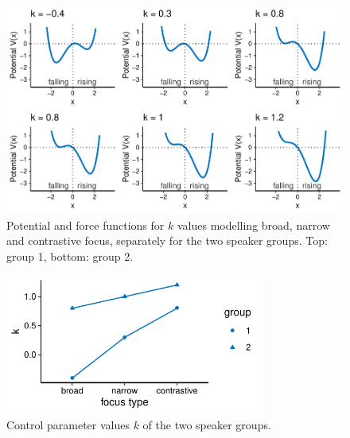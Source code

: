\begin{figure}[htbp]
\begin{center}
\includegraphics[width=\textwidth]{figures/ch6/potentials_groups.pdf}
\caption[Potential and force functions for $k$ values modelling broad (left), narrow (centre) and contrastive focus (right), separately for the two speaker groups.]{Potential and force functions for $k$ values modelling broad, narrow and contrastive focus, separately for the two speaker groups. Top: group 1, bottom: group 2.}
\label{fig:potentials_groups}
\end{center}
\end{figure}

\begin{figure}[htbp]
\begin{center}
\includegraphics[width=8.5cm]{figures/ch6/groups_k.pdf}
\caption{Control parameter values $k$ of the two speaker groups.}
\label{fig:groups_k}
\end{center}
\end{figure}

